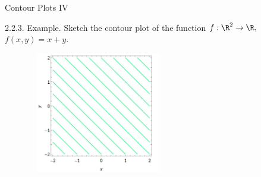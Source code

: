 \documentclass[smaller,hyperref={CJKbookmarks=true}]{beamer}
\begin{document}
\begin{frame}[t]{Contour Plots IV}
\begin{spacing}{1.05}
\alert{2.2.3. Example.} Sketch the contour plot of the function $f:\R^2\to\R,$\\$f(x,y)=x+y$.
\begin{figure}
  \centering
  \includegraphics[width=0.55\textwidth,height=150pt]{mt4.jpg}

\end{figure}
\end{spacing}
\end{frame}
\end{document}
